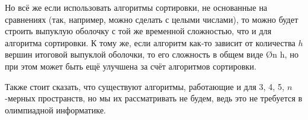 Но всё же если использовать алгоритмы сортировки, не основанные на сравнениях (так, например, можно сделать с целыми числами), то можно будет строить выпуклую оболочку с той же временной сложностью, что и для алгоритма сортировки. К тому же, если алгоритм как-то зависит от количества $h$ вершин итоговой выпуклой оболочки, то его сложность в общем виде \O{n \log h}, но при этом может быть ещё улучшена за счёт алгоритмов сортировки.

Также стоит сказать, что существуют алгоритмы, работающие и для 3, 4, 5, $n$-мерных пространств, но мы их рассматривать не будем, ведь это не требуется в олимпиадной информатике.

